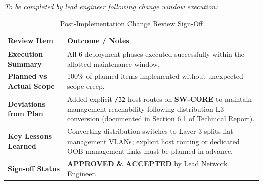 \documentclass[11pt,a4paper]{article}
\begin{document}
\textit{To be completed by lead engineer following change window execution:}

\begin{table}[htbp]
\centering
\caption{Post-Implementation Change Review Sign-Off}
\label{tab:post_review}
\small
\begin{tabularx}{\textwidth}{@{}p{} L@{}}
\toprule
\textbf{Review Item} & \textbf{Outcome / Notes} \\
\midrule
\textbf{Execution Summary} & All 6 deployment phases executed successfully within the allotted maintenance window. \\
\midrule
\textbf{Planned vs Actual Scope} & 100\% of planned items implemented without unexpected scope creep. \\
\midrule
\textbf{Deviations from Plan} & Added explicit \texttt{/32} host routes on \textbf{SW-CORE} to maintain management reachability following distribution L3 conversion (documented in Section 6.1 of Technical Report). \\
\midrule
\textbf{Key Lessons Learned} & Converting distribution switches to Layer 3 splits flat management VLANs; explicit host routing or dedicated OOB management links must be planned in advance. \\
\midrule
\textbf{Sign-off Status} & \textbf{APPROVED \& ACCEPTED} by Lead Network Engineer. \\
\bottomrule
\end{tabularx}
\end{table}
\end{document}
